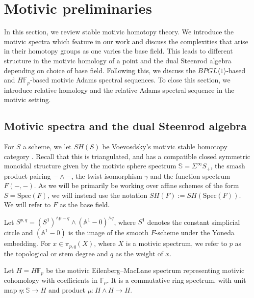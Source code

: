 \documentclass{amsart}
\theoremstyle{plain}
\numberwithin{theorem}{section}
\numberwithin{equation}{section}
\numberwithin{figure}{section}
\newcommand{\mF}{{\mathbb F}}
\newcommand{\mS}{{\mathbb S}}
\newcommand{\0}{\langle 0 \rangle }
\begin{document}
\section{Motivic preliminaries} 
\label{sec:motivic prelim}
In this section, we review stable motivic homotopy theory. We introduce the motivic spectra which feature in our work and discuss the complexities that arise in their homotopy groups as one varies the base field. This leads to different structure in the motivic homology of a point and the dual Steenrod algebra depending on choice of base field. Following this, we discuss the $BPGL \langle 1 \rangle$-based and $H\mathbb{F}_p$-based motivic Adams spectral sequences. To close this section, we introduce relative homology and the relative Adams spectral sequence in the motivic setting.

\subsection{Motivic spectra and the dual Steenrod algebra}
For $S$ a scheme, we let $SH(S)$ be Voevosdsky's motivic stable homotopy category \cite[Def. 5.7]{Voevosdsky98} \cite{Jardine00}. Recall that this is triangulated, and has a compatible closed symmetric monoidal structure given by the motivic sphere spectrum $\mS = \Sigma^\infty S_+$, the smash product pairing $- \wedge -$, the twist isomorphism $\gamma$ and the function spectrum $F(-,-)$. As we will be primarily be working over affine schemes of the form $S = \text{Spec}(F)$, we will instead use the notation $SH(F):= SH(\text{Spec}(F))$. We will refer to $F$ as the base field. 

Let $S^{p,q}=(S^1)^{\wedge p-q} \wedge (\mathbb{A}^1 - 0 )^{\wedge q}$, where $S^1$ denotes the constant simplicial circle and $(\mathbb{A}^1 - 0)$ is the image of the smooth $F$-scheme under the Yoneda embedding. For $x \in \pi_{p,q} (X)$, where $X$ is a motivic spectrum, we refer to $p$ as the topological or stem degree and $q$ as the weight of $x$. 

Let $H = H \mF_p$ be the motivic Eilenberg--MacLane spectrum representing motivic cohomology with coefficients in $\mF_p$. It is a commutative ring spectrum, with unit map $\eta: \mS \to H$ and product $\mu: H \wedge H \to H$. 

\end{document}
